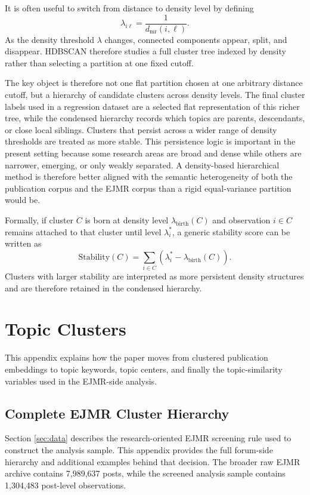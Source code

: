 \documentclass[11pt]{article}
\begin{document}
It is often useful to switch from distance to density level by defining
\[
\lambda_{i\ell} = \frac{1}{d_{\mathrm{mr}}(i,\ell)}.
\]
As the density threshold $\lambda$ changes, connected components appear, split, and disappear. HDBSCAN therefore studies a full cluster tree indexed by density rather than selecting a partition at one fixed cutoff.

The key object is therefore not one flat partition chosen at one arbitrary distance cutoff, but a hierarchy of candidate clusters across density levels. The final cluster labels used in a regression dataset are a selected flat representation of this richer tree, while the condensed hierarchy records which topics are parents, descendants, or close local siblings. Clusters that persist across a wider range of density thresholds are treated as more stable. This persistence logic is important in the present setting because some research areas are broad and dense while others are narrower, emerging, or only weakly separated. A density-based hierarchical method is therefore better aligned with the semantic heterogeneity of both the publication corpus and the EJMR corpus than a rigid equal-variance partition would be.

Formally, if cluster $C$ is born at density level $\lambda_{\mathrm{birth}}(C)$ and observation $i \in C$ remains attached to that cluster until level $\lambda_i^{\ast}$, a generic stability score can be written as
\[
\mathrm{Stability}(C)
=
\sum_{i \in C}\left(\lambda_i^{\ast}-\lambda_{\mathrm{birth}}(C)\right).
\]
Clusters with larger stability are interpreted as more persistent density structures and are therefore retained in the condensed hierarchy.

\section{Topic Clusters}
\label{app:topic_clusters}

This appendix explains how the paper moves from clustered publication embeddings to topic keywords, topic centers, and finally the topic-similarity variables used in the EJMR-side analysis.

\subsection{Complete EJMR Cluster Hierarchy}
\label{app:ejmr_sample_screening}

Section \ref{sec:data} describes the research-oriented EJMR screening rule used to construct the analysis sample. This appendix provides the full forum-side hierarchy and additional examples behind that decision. The broader raw EJMR archive contains 7,989,637 posts, while the screened analysis sample contains 1,304,483 post-level observations.
\end{document}
